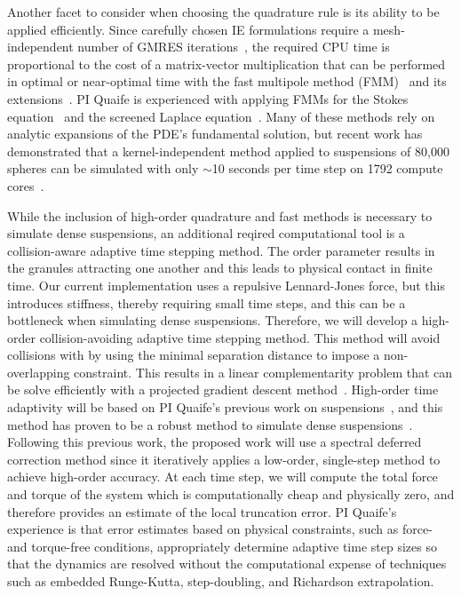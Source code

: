 Another facet to consider when choosing the quadrature rule is its
ability to be applied efficiently. Since carefully chosen IE
formulations require a mesh-independent number of GMRES
iterations~\cite{cam-ips-kel-mey-xue1996}, the required CPU time is
proportional to the cost of a matrix-vector multiplication that can be
performed in optimal or near-optimal time with the fast multipole method
(FMM)~\cite{fmm5} and its extensions~\cite{fmm1, fmm2, fmm3, fmm4, fmm6,
fmm7, ros-ols2016}. PI Quaife is experienced with applying FMMs for the
Stokes equation~\cite{qua-bir2014, bys-sha-qua2020} and the screened
Laplace equation~\cite{kro-qua2011, qua2011}. Many of these methods rely
on analytic expansions of the PDE's fundamental solution, but recent
work has demonstrated that a kernel-independent method applied to
suspensions of 80,000 spheres can be simulated with only $\sim$10
seconds per time step on 1792 compute cores~\cite{Yan2019}.

While the inclusion of high-order quadrature and fast methods is
necessary to simulate dense suspensions, an additional reqired
computational tool is a collision-aware adaptive time stepping method.
The order parameter results in the granules attracting one another and
this leads to physical contact in finite time. Our current
implementation uses a repulsive Lennard-Jones force, but this introduces
stiffness, thereby requiring small time steps, and this can be a
bottleneck when simulating dense suspensions. Therefore, we will develop
a high-order collision-avoiding adaptive time stepping method. This
method will avoid collisions with by using the minimal separation
distance to impose a non-overlapping constraint. This results in a
linear complementarity problem that can be solve efficiently with a
projected gradient descent method~\cite{Yan2019}. High-order time
adaptivity will be based on PI Quaife's previous work on
suspensions~\cite{qua-bir2016}, and this method has proven to be a
robust method to simulate dense suspensions~\cite{qua-vee-you2019,
kab-qua-bir2017, qua-gan-you2021}. Following this previous work, the
proposed work will use a spectral deferred correction method since it
iteratively applies a low-order, single-step method to achieve
high-order accuracy. At each time step, we will compute the total force
and torque of the system which is computationally cheap and physically
zero, and therefore provides an estimate of the local truncation error.
PI Quaife's experience is that error estimates based on physical
constraints, such as force- and torque-free conditions, appropriately
determine adaptive time step sizes so that the dynamics are resolved
without the computational expense of techniques such as embedded
Runge-Kutta, step-doubling, and Richardson extrapolation.
